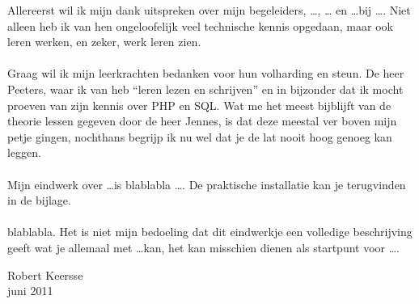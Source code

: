 Allereerst wil ik mijn dank uitspreken over mijn begeleiders, \ldots, \ldots
en \ldots bij \ldots. Niet alleen heb ik van hen ongeloofelijk veel
technische kennis opgedaan, maar ook leren werken, en zeker, werk leren zien.
\\\\
Graag wil ik mijn leerkrachten bedanken voor hun volharding en steun. De heer
Peeters, waar ik van heb ``leren lezen en schrijven'' en in bijzonder dat ik mocht
proeven van zijn kennis over PHP en SQL. Wat me het meest bijblijft van de
theorie lessen gegeven door de heer Jennes, is dat deze meestal ver boven mijn
petje gingen, nochthans begrijp ik nu wel dat je de lat nooit hoog genoeg kan
leggen.
\\\\
Mijn eindwerk over \ldots is blablabla \ldots. De
praktische installatie kan je terugvinden in de bijlage.
\\\\
blablabla. Het is niet mijn bedoeling dat dit eindwerkje een
volledige beschrijving geeft wat je allemaal met \ldots kan, het kan misschien
dienen als startpunt voor \ldots.

\begin{flushright}
Robert Keersse\\juni 2011
\end{flushright}